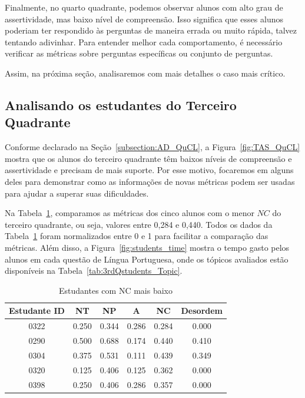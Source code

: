 Finalmente, no quarto quadrante, podemos observar alunos com alto grau de assertividade, mas baixo nível de compreensão. Isso significa que esses alunos poderiam ter respondido às perguntas de maneira errada ou muito rápida, talvez tentando adivinhar. Para entender melhor cada comportamento, é necessário verificar as métricas sobre perguntas específicas ou conjunto de perguntas.

Assim, na próxima seção, analisaremos com mais detalhes o caso mais crítico.

\subsection{Analisando os estudantes do Terceiro Quadrante}\label{subsection:3rdQnd}

Conforme declarado na Seção~\ref{subsection:AD_QuCL}, a Figura~\ref{fig:TAS_QuCL} mostra que os alunos do terceiro quadrante têm baixos níveis de compreensão e assertividade e precisam de mais suporte. Por esse motivo, focaremos em alguns deles para demonstrar como as informações de novas métricas podem ser usadas para ajudar a superar suas dificuldades.

Na Tabela~\ref{tab:3rdQstudents}, comparamos as métricas dos cinco alunos com o menor $NC$ do terceiro quadrante, ou seja, valores entre 0,284 e 0,440.
Todos os dados da Tabela~\ref{tab:3rdQstudents} foram normalizados entre 0 e 1 para facilitar a comparação das métricas.
Além disso, a Figura~\ref{fig:students_time} mostra o tempo gasto pelos alunos em cada questão de Língua Portuguesa, onde os tópicos avaliados estão disponíveis na Tabela~\ref{tab:3rdQstudents_Topic}.

\begin{table}[htbp]
\caption{Estudantes com NC mais baixo}
\centering
\begin{tabular}{|c|c|c|c|c|c|}
\hline
\textbf{Estudante ID} & \textbf{NT} & \textbf{NP} & %
\textbf{A} & \textbf{NC} & \textbf{Desordem} \\ \hline
0322 & 0.250 & 0.344 & %
0.286 & 0.284 & 0.000 \\ \hline
0290 & 0.500 & 0.688 & %
0.174 & 0.440 & 0.410 \\ \hline
0304 & 0.375 & 0.531 & %
0.111 & 0.439 & 0.349 \\ \hline
0320 & 0.125 & 0.406 & %
0.125 & 0.362 & 0.000 \\ \hline
0398 & 0.250 & 0.406 & %
0.286 & 0.357 & 0.000 \\ \hline
\end{tabular}
\label{tab:3rdQstudents}
\end{table}

